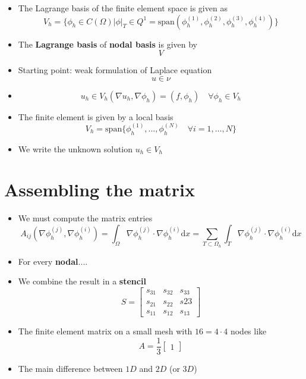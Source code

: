 \documentclass[openany]{memoir}
\theoremstyle{defintion}
\begin{document}
\begin{itemize}
\item The Lagrange basis of the finite element space is given as \[ V_h=\{\phi_h\in C(\Omega)|\phi|_{T}\in Q^1=\text{span}(\phi^{(1)}_h,\phi^{(2)}_h,\phi^{(3)}_h,\phi^{(4)}_h) \} \]
\item The \textbf{Lagrange basis} of \textbf{nodal basis} is given by \[ V \]
\end{itemize}

\begin{itemize}
\item Starting point: weak formulation of Laplace equation \[u\in\nu \]
\item \[u_h\in V_h (\nabla u_h, \nabla\phi_h)=(f,\phi_h)\quad\forall\phi_h\in V_h \]
\item The finite element is given by a local basis \[V_h=\text{span}\{\phi^{(1)}_h,\ldots,\phi^{(N)}_h\quad\forall i=1,\ldots, N \} \]
\item We write the unknown solution $u_h\in V_h$
\end{itemize}

\section{Assembling the matrix}

\begin{itemize}
\item We must compute the matrix entries \[A_{ij}(\nabla\phi_h^{(j)}, \nabla\phi_h^{(i)})=\int_\Omega\nabla\phi_h^{(j)}\cdot\nabla\phi_h^{(i)}\mathrm{d}x=\sum_{T\subset\Omega_h}\int_T\nabla\phi_h^{(j)}\cdot\nabla\phi_h^{(i)}\mathrm{d}x \]
\item For every \textbf{nodal}....
\end{itemize}

\begin{itemize}
\item We combine the result in a \textbf{stencil}
  \[
    S =
    \begin{bmatrix}
      s_{31} & s_{32} & s_{33} \\
      s_{21} & s_{22} & s{23} \\
      s_{11} & s_{12} & s_{13}
    \end{bmatrix}
  \]
\item The finite element matrix on a small mesh with $16=4\cdot 4$ nodes like
  \[
    A=\frac{1}{3}
    \begin{bmatrix}
      1
    \end{bmatrix}
  \]
\end{itemize}

\begin{itemize}
\item The main difference between $1D$ and $2D$ (or $3D$)
\end{itemize}
\end{document}
